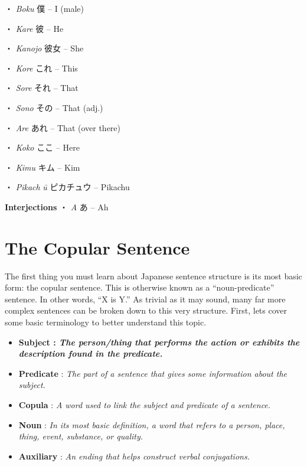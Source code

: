 \par{・ \emph{Boku }僕 – I (male) }
 
\par{・ \emph{Kare }彼 – He }
 
\par{・ \emph{Kanojo }彼女 – She }
 
\par{・ \emph{Kore }これ – This }
 
\par{・ \emph{Sore }それ – That }
 
\par{・ \emph{Sono }その – That (adj.) }
 
\par{・ \emph{Are }あれ – That (over there) }
 
\par{・ \emph{Koko }ここ – Here }
 
\par{・ \emph{Kimu }キム – Kim }
 
\par{・ \emph{Pikach }\emph{ū }ピカチュウ – Pikachu }
 
\par{\textbf{Interjections }}
・ \emph{A }あ – Ah       
\section{The Copular Sentence}
 
\par{ The first thing you must learn about Japanese sentence structure is its most basic form: the copular sentence. This is otherwise known as a “noun-predicate” sentence. In other words, “X is Y.” As trivial as it may sound, many far more complex sentences can be broken down to this very structure. First, let\textquotesingle s cover some basic terminology to better understand this topic. }

\begin{itemize}

\item \textbf{\textbf{Subject }: \emph{The person\slash thing that performs the action or exhibits the description found in the predicate. }}
\item \textbf{Predicate }: \emph{The part of a sentence that gives some information about the subject. }
\item \textbf{Copula }: \emph{A word used to link the subject and predicate of a sentence. }\hfill\break

\item \textbf{Noun }: \emph{In its most basic definition, a word that refers to a person, place, thing, event, substance, or quality. }\hfill\break

\item \textbf{Auxiliary }: \emph{An ending that helps construct verbal conjugations. }
\end{itemize}
 
